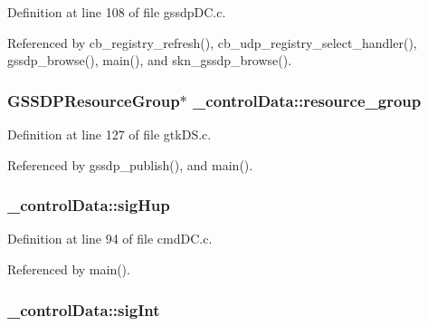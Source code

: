 Definition at line 108 of file gssdp\+D\+C.\+c.



Referenced by cb\+\_\+registry\+\_\+refresh(), cb\+\_\+udp\+\_\+registry\+\_\+select\+\_\+handler(), gssdp\+\_\+browse(), main(), and skn\+\_\+gssdp\+\_\+browse().

\hypertarget{struct__control_data_ab8684a42dc1f2e00247d7278d47046b9}{
\subsubsection[{resource\+\_\+group}]{\setlength{\rightskip}{0pt plus 5cm}G\+S\+S\+D\+P\+Resource\+Group$\ast$ \+\_\+control\+Data\+::resource\+\_\+group}}\label{struct__control_data_ab8684a42dc1f2e00247d7278d47046b9}


Definition at line 127 of file gtk\+D\+S.\+c.



Referenced by gssdp\+\_\+publish(), and main().

\hypertarget{struct__control_data_a551d0ecd4ceb9fc4ce8eebe5a984dc4c}{
\subsubsection[{sig\+Hup}]{ \+\_\+control\+Data\+::sig\+Hup}}\label{struct__control_data_a551d0ecd4ceb9fc4ce8eebe5a984dc4c}


Definition at line 94 of file cmd\+D\+C.\+c.



Referenced by main().

\hypertarget{struct__control_data_ae8ad5b5af46f4ab4bcd6ffb41e83385b}{
\subsubsection[{sig\+Int}]{ \+\_\+control\+Data\+::sig\+Int}}\label{struct__control_data_ae8ad5b5af46f4ab4bcd6ffb41e83385b}


